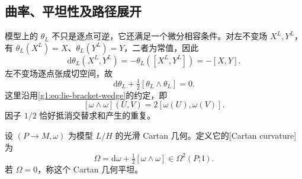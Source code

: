 \subsection{曲率、平坦性及路径展开}
\label{g1:subsec:D02:02}

模型上的 \(\theta_L\) 不只是逐点可逆，它还满足一个微分相容条件。对左不变场 \(X^L,Y^L\)，有 \(\theta_L(X^L)=X\)、\(\theta_L(Y^L)=Y\)，二者为常值，因此
\[
	\mathrm{d}\theta_L(X^L,Y^L)
	=-\theta_L([X^L,Y^L])=-[X,Y].
\]
左不变场逐点张成切空间，故
\begin{equation}\label{g1:eq:cartan-model-mc}
	\mathrm{d}\theta_L+\tfrac12[\theta_L\wedge\theta_L]=0.
\end{equation}
这里沿用\eqref{g1:eq:lie-bracket-wedge}的约定，即
\[
	[\omega\wedge\omega](U,V)=2[\omega(U),\omega(V)].
\]
因子 \(1/2\) 恰好抵消交替求和产生的重复。

\begin{definition}\label{g1:def:cartan-curvature}
	设 \((P\to M,\omega)\) 为模型 \(L/H\) 的光滑 Cartan 几何。定义它的[Cartan curvature]为
	\begin{equation}\label{g1:eq:cartan-curvature}
		\Omega=\mathrm{d}\omega+\tfrac12[\omega\wedge\omega]
		\in\Omega^2(P;\mathfrak l).
	\end{equation}
	若 \(\Omega=0\)，称这个 Cartan 几何平坦。
\end{definition}

